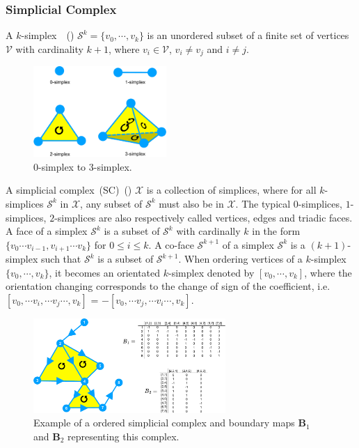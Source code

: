 \subsubsection{Simplicial Complex}
A $k$-simplex~\citep{schaub2021signal}~() $\mathcal{S}^k = \{{v}_0,\cdots,{v}_k \}$ is an unordered subset of a finite set of vertices $\mathcal{V}$ with cardinality $k + 1$, where $v_i\in \mathcal{V}$, $v_i \neq v_j$ and $i \neq j$.

\begin{figure}[!h]
    \centering
    \includegraphics[width=0.45\textwidth]{Simplex/fig}
    \vspace{0.1cm}
    \caption[0-simplex to 3-simplex.]{0-simplex to 3-simplex.}
    \label{fig:simplex}
\end{figure}

A simplicial complex~(SC)~() $\mathcal{X}$ is a collection of simplices, where for all $k$-simplices $\mathcal{S}^k$ in $\mathcal{X}$, any subset of $\mathcal{S}^k$ must also be in $\mathcal{X}$. The typical $0$-simplices, $1$-simplices, $2$-simplices are also respectively called vertices, edges and triadic faces. A face of a simplex $\mathcal{S}^k$ is a subset of $\mathcal{S}^k$  with cardinally $k$ in the form $\{v_0 \cdots v_{i-1}, v_{i+1}\cdots v_k\}$ for $0 \leq i \leq k$. A co-face $\mathcal{S}^{k+1}$ of a simplex $\mathcal{S}^k$ is a $(k + 1)$-simplex such that $\mathcal{S}^k$ is a subset of $\mathcal{S}^{k+1}$.  When ordering vertices of a $k$-simplex $\{{v}_0,\cdots,{v}_k \}$, it becomes an orientated $k$-simplex denoted by $[{v}_0,\cdots,{v}_k ]$, where the orientation changing corresponds to the change of sign of the coefficient, i.e. $[{v}_0,\cdots {v}_i, \cdots {v}_j\cdots,{v}_k ]$ = $-[{v}_0,\cdots {v}_j, \cdots {v}_i\cdots,{v}_k ]$.

\begin{figure}[!h]
    \centering
    \includegraphics[width=0.65\textwidth]{Simplicial_Complex/fig}
    \vspace{0.1cm}
    \caption[A simplicial complex example.]{Example of a ordered simplicial complex and boundary maps $\mathbf{B}_1$ and $\mathbf{B}_2$ representing this
complex.}
    \label{fig:sc}
\end{figure}


